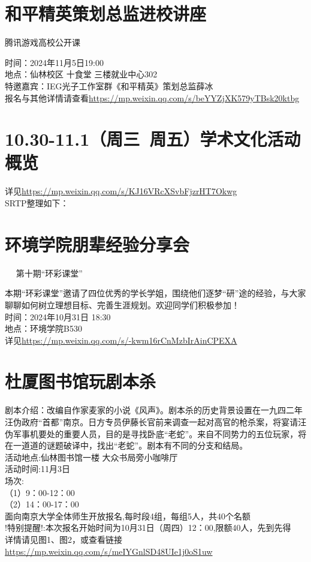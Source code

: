 \documentclass[letterpaper, 12pt]{article}
\begin{document}
\begin{multicols}{2}
\section{和平精英策划总监进校讲座}
腾讯游戏高校公开课

时间：2024年11月5日19:00\\
地点：仙林校区 十食堂 三楼就业中心302\\
特邀嘉宾：IEG光子工作室群《和平精英》策划总监薛冰\\
报名与其他详情请查看\url{https://mp.weixin.qq.com/s/beYYZjXK579yTBsk20ktbg}\\
\section{10.30-11.1（周三~周五）学术文化活动概览}

详见\url{https://mp.weixin.qq.com/s/KJ16VRcXSvbFjzrHT7Okwg}\\

SRTP整理如下：\\
\section{环境学院朋辈经验分享会}  
第十期“环彩课堂”

本期“环彩课堂”邀请了四位优秀的学长学姐，围绕他们逐梦“研”途的经验，与大家聊聊如何树立理想目标、完善生涯规划。欢迎同学们积极参加！\\

时间：2024年10月31日 18:30\\
地点：环境学院B530\\
详见\url{https://mp.weixin.qq.com/s/-kwm16rCnMzbIrAinCPEXA}
\section{杜厦图书馆玩剧本杀}
剧本介绍：改编自作家麦家的小说《风声》。剧本杀的历史背景设置在一九四二年汪伪政府“首都”南京。日方专员伊藤长官前来调查一起对高官的枪杀案，将宴请汪伪军事机要处的重要人员，目的是寻找卧底“老蛇”。来自不同势力的五位玩家，将在一道道的谜题破译中，找出“老蛇”。剧本有不同的分支和结局。\\
活动地点:仙林图书馆一楼  大众书局旁小咖啡厅\\
活动时间:11月3日\\
场次:\\
（1）9：00-12：00\\
（2）14：00-17：00\\
面向南京大学全体师生开放报名,每时段4组，每组5人，共40个名额\\
!特别提醒!:本次报名开始时间为10月31日（周四）12：00,限额40人，先到先得\\
详情请见图1、图2，或查看链接\url{https://mp.weixin.qq.com/s/meIYGnlSD48UIe1j0oS1uw}


\end{multicols} 
\end{document}
